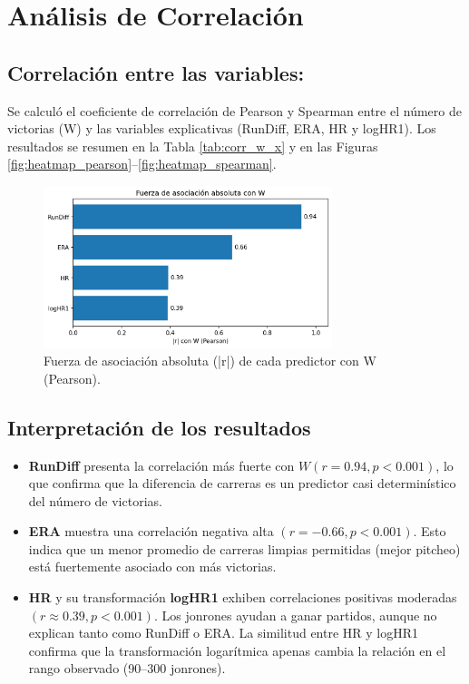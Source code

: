 \documentclass[man,floatsintext]{apa7}
\begin{document}
\section{Análisis de Correlación}
\subsection{Correlación entre las variables:}

Se calculó el coeficiente de correlación de Pearson y Spearman entre el número de victorias (W) y las variables explicativas 
(RunDiff, ERA, HR y logHR1). Los resultados se resumen en la Tabla \ref{tab:corr_w_x} y en las Figuras 
\ref{fig:heatmap_pearson}--\ref{fig:heatmap_spearman}.



\begin{figure}[H]
    \centering
    \includegraphics[width=0.75\textwidth]{../plots/bar_abs_r_W.png}
    \caption{Fuerza de asociación absoluta (|r|) de cada predictor con W (Pearson).}
    \label{fig:bar_abs_r}
\end{figure}

\subsection{Interpretación de los resultados}

\begin{itemize}
    \item \textbf{RunDiff} presenta la correlación más fuerte con $W (r = 0.94, p < 0.001)$, lo que confirma que la diferencia de carreras es un predictor casi determinístico del número de victorias.
    \item \textbf{ERA} muestra una correlación negativa alta $(r = -0.66, p < 0.001)$. Esto indica que un menor promedio de carreras limpias permitidas (mejor pitcheo) está fuertemente asociado con más victorias.
    \item \textbf{HR} y su transformación \textbf{logHR1} exhiben correlaciones positivas moderadas $(r \approx 0.39, p < 0.001)$. Los jonrones ayudan a ganar partidos, aunque no explican tanto como RunDiff o ERA. La similitud entre HR y logHR1 confirma que la transformación logarítmica apenas cambia la relación en el rango observado (90--300 jonrones).
\end{itemize}
\end{document}
